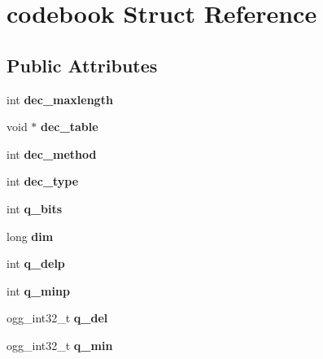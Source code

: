 \hypertarget{structcodebook}{}\section{codebook Struct Reference}
\label{structcodebook}
\subsection*{Public Attributes}
\begin{DoxyCompactItemize}
\item 
\mbox{\label{structcodebook_a53d70c4645254078f75ddd0420ce8e52}} 
int {\bfseries dec\+\_\+maxlength}
\item 
\mbox{\label{structcodebook_a5d7cef3d740592c94b4370ca9b1a7864}} 
void $\ast$ {\bfseries dec\+\_\+table}
\item 
\mbox{\label{structcodebook_ac50c91e6ffeb1dfb1f75c400291d539c}} 
int {\bfseries dec\+\_\+method}
\item 
\mbox{\label{structcodebook_ad1c9944313cf3322cbae7ba9b1f7d9c8}} 
int {\bfseries dec\+\_\+type}
\item 
\mbox{\label{structcodebook_acab3e0b1bf1852cfaa07344ab6f38f16}} 
int {\bfseries q\+\_\+bits}
\item 
\mbox{\label{structcodebook_a686979784ac16e673f22201ed3c4a155}} 
long {\bfseries dim}
\item 
\mbox{\label{structcodebook_a275dcb2ab681a856b889827ae7bf0a3c}} 
int {\bfseries q\+\_\+delp}
\item 
\mbox{\label{structcodebook_af52fa984e3291aaeeacfe9a2125696b2}} 
int {\bfseries q\+\_\+minp}
\item 
\mbox{\label{structcodebook_a3db082c5d53621567c04cef14e8a4727}} 
ogg\+\_\+int32\+\_\+t {\bfseries q\+\_\+del}
\item 
\mbox{\label{structcodebook_a207aa139d06c4ed54384f7ce8db6bbf6}} 
ogg\+\_\+int32\+\_\+t {\bfseries q\+\_\+min}

\end{DoxyCompactItemize}
